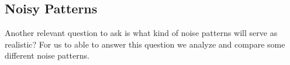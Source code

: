 \documentclass{article}
\begin{document}
\begin{figure}

\end{figure}
  
\subsection{Noisy Patterns}
Another relevant question to ask is what kind of noise patterns will serve as realistic? For us to able to answer this question we analyze and compare some different noise patterns. 

        






%


%
%



\end{document}
